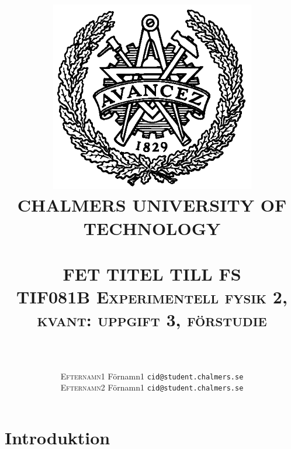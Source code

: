 \documentclass{article}
\title{
\includegraphics[scale=0.2]{fig/Chalmers_logo.png}\\[0.3cm]
\textsc{\Large CHALMERS UNIVERSITY OF TECHNOLOGY}\\[0.5cm] 
\HRule\\
\huge \textsc{FET TITEL TILL FS}\\ \vspace*{0.3cm}
\normalsize{\textsc{TIF081B Experimentell fysik 2, kvant: uppgift 3, förstudie }}\\\HRule\\\vspace{0.5cm} \author{\textsc{Efternamn1} Förnamn1 \texttt{cid@student.chalmers.se}\\ \textsc{Efternamn2} Förnamn1 \texttt{cid@student.chalmers.se}}}
\begin{document}
\maketitle
\newpage
\section{Introduktion}

%
\end{document}
